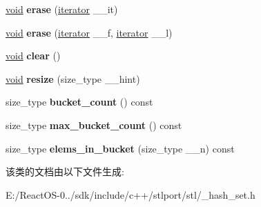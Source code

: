 \begin{DoxyCompactItemize}
\item 
\mbox{\label{classhash__multiset_a616d1fcd638110bec29bc6b88717d7d0}} 
\hyperlink{interfacevoid}{void} {\bfseries erase} (\hyperlink{structiterator}{iterator} \+\_\+\+\_\+it)
\item 
\mbox{\label{classhash__multiset_a3d151b827af109c061ca3a469b8c1deb}} 
\hyperlink{interfacevoid}{void} {\bfseries erase} (\hyperlink{structiterator}{iterator} \+\_\+\+\_\+f, \hyperlink{structiterator}{iterator} \+\_\+\+\_\+l)
\item 
\mbox{\label{classhash__multiset_a860058f80274990e0974d7559c945c6c}} 
\hyperlink{interfacevoid}{void} {\bfseries clear} ()
\item 
\mbox{\label{classhash__multiset_ace490be24d8853ea642dd1261f71dc97}} 
\hyperlink{interfacevoid}{void} {\bfseries resize} (size\+\_\+type \+\_\+\+\_\+hint)
\item 
\mbox{\label{classhash__multiset_a53a338bc06daedb2065ce3ee6e207b14}} 
size\+\_\+type {\bfseries bucket\+\_\+count} () const
\item 
\mbox{\label{classhash__multiset_a97c22ef3704c7546ed066624d75da440}} 
size\+\_\+type {\bfseries max\+\_\+bucket\+\_\+count} () const
\item 
\mbox{\label{classhash__multiset_a685ec0e4adf244291f929b58f478ef12}} 
size\+\_\+type {\bfseries elems\+\_\+in\+\_\+bucket} (size\+\_\+type \+\_\+\+\_\+n) const
\end{DoxyCompactItemize}


该类的文档由以下文件生成\+:\begin{DoxyCompactItemize}
\item 
E\+:/\+React\+O\+S-\/0../sdk/include/c++/stlport/stl/\+\_\+hash\+\_\+set.\+h\end{DoxyCompactItemize}
